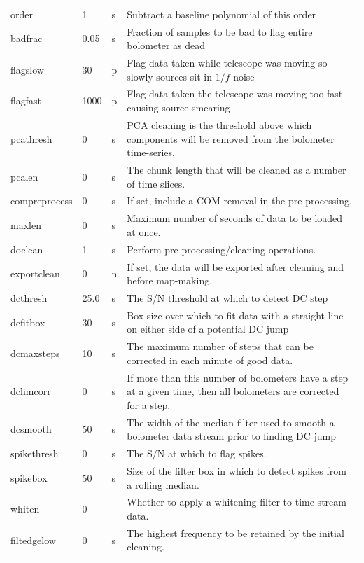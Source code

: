 \documentclass[twoside,11pt]{article}
\newenvironment{latexonly}{}{}
\renewcommand{\_}{\texttt{\symbol{95}}}
\begin{document}
\begin{latexonly}
\begin{table}
\begin{center}
\begin{footnotesize}
\begin{tabular}{|p{2.1cm}|p{0.8cm}|p{0.2cm}|p{11.2cm}|}
order & 1 &s &Subtract a baseline polynomial of this order\\
badfrac & 0.05 &s& Fraction of samples to be bad to flag entire bolometer
                        as dead\\
flagslow & 30 & p&Flag data taken while telescope was moving so slowly
                        sources sit in $1/f$ noise\\
flagfast & 1000 &p& Flag data taken the telescope was moving too fast causing source
                        smearing\\
pcathresh & 0 &s& PCA cleaning is the threshold above which components
                        will be removed from the bolometer time-series.\\
pcalen & 0 &s &The chunk length that will be cleaned as a number of time slices.\\
compreprocess& 0 &s& If set, include a COM removal in the pre-processing.\\
maxlen& 0 &s &Maximum number of seconds of data to be loaded at once.\\
doclean& 1 &s&Perform pre-processing/cleaning operations. \\
exportclean& 0 &n&If set, the data will be exported after cleaning and before map-making. \\
dcthresh & 25.0 &s& The S/N threshold at which to detect DC step\\
dcfitbox & 30 &s& Box size over which to fit data with a straight
                        line on either side of a potential DC jump\\
dcmaxsteps & 10 &s& The maximum number of steps that can be corrected
                        in each minute of good data.\\
dclimcorr & 0 &s& If more than this number of bolometers have a step at
                        a given time, then all bolometers are corrected for
                        a step.\\
dcsmooth & 50 &s& The width of the median filter used to smooth a
                        bolometer data stream prior to finding DC jump\\
spikethresh & 0 &s& The S/N at which to flag spikes.\\
spikebox & 50 &s& Size of the filter box in which to detect spikes from a rolling median.\\
whiten & 0 &&Whether to apply a whitening filter to time stream data. \\
filt\_edgelow & 0 &s&The highest frequency to be retained by the initial cleaning. \\

\end{tabular}
\end{footnotesize}
\end{center}
\end{table}
\end{latexonly}
\end{document}

